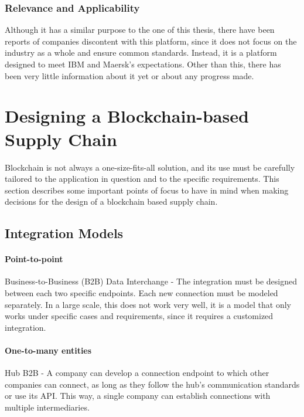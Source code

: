 \subsubsection{Relevance and Applicability}

Although it has a similar purpose to the one of this thesis, there have been reports of companies discontent with this platform, since it does not focus on the industry as a whole and ensure common standards. Instead, it is a platform designed to meet IBM and Maersk's expectations. Other than this, there has been very little information about it yet or about any progress made.



\section{Designing a Blockchain-based Supply Chain}

Blockchain is not always a one-size-fits-all solution, and its use must be carefully tailored to the application in question and to the specific requirements. This section describes some important points of focus to have in mind when making decisions for the design of a blockchain based supply chain.

\subsection{Integration Models}
\paragraph{Point-to-point} Business-to-Business (B2B) Data Interchange - The integration must be designed between each two specific endpoints. Each new connection must be modeled separately. In a large scale, this does not work very well, it is a model that only works under specific cases and requirements, since it requires a customized integration.

\paragraph{One-to-many entities} Hub B2B - A company can develop a connection endpoint to which other companies can connect, as long as they follow the hub's communication standards or use its API. This way, a  single company can establish connections with multiple intermediaries.

